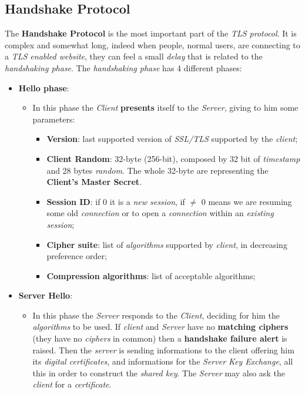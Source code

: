 \documentclass{article}
\begin{document}
\subsection{Handshake Protocol}
The \textbf{Handshake Protocol} is the most important part of the \emph{TLS protocol}. It is complex and somewhat long, indeed when people, normal users, are connecting to a \emph{TLS enabled website}, they can feel a small \emph{delay} that is related to the \emph{handshaking phase}. The \emph{handshaking phase} has 4 different phases:
\begin{itemize}
\item\textbf{ Hello phase}:
\begin{itemize}
\item In this phase the \emph{Client} \textbf{presents} itself to the \emph{Server}, giving to him some parameters:
\begin{itemize}
\item \textbf{Version}: last supported version of \emph{SSL/TLS} supported by the \emph{client};
\item \textbf{Client Random}: 32-byte (256-bit), composed by 32 bit of \emph{timestamp} and 28 bytes \emph{random}. The whole 32-byte are representing the \textbf{Client’s Master Secret}.
\item \textbf{Session ID}: if 0 it is a \emph{new session}, if $\neq$ 0 means we are resuming some old \emph{connection} or to open a \emph{connection} within an \emph{existing session};
\item \textbf{Cipher suite}: list of \emph{algorithms} supported by \emph{client}, in decreasing preference order;
\item \textbf{Compression algorithms}: list of acceptable algorithms;
\end{itemize}
\end{itemize}
\item \textbf{Server Hello}:
\begin{itemize}
\item In this phase the \emph{Server} responds to the \emph{Client}, deciding for him the \emph{algorithms} to be used. If \emph{client} and \emph{Server} have no \textbf{matching ciphers} (they have no \emph{ciphers} in common) then a \textbf{handshake failure alert} is raised. Then the \emph{server} is sending informations to the client offering him its \emph{digital certificates}, and informations for the \emph{Server Key Exchange}, all this in order to construct the \emph{shared key}. The \emph{Server} may also ask the \emph{client} for a \emph{certificate}.

\end{itemize}
\end{itemize}
\end{document}
